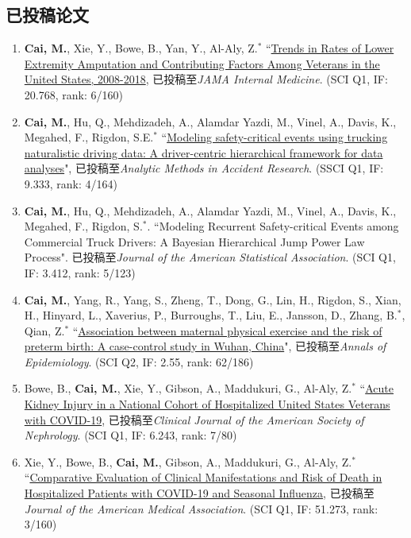 \documentclass[11pt, a4paper]{article}
\begin{document}
	\subsection*{已投稿论文}
	\begin{enumerate}[leftmargin=0ex,itemsep=1ex]
		\item \textbf{Cai, M.}, Xie, Y., Bowe, B., Yan, Y., Al-Aly, Z.$^\ast$ ``\ul{Trends in Rates of Lower Extremity Amputation and Contributing Factors Among Veterans in the United States, 2008-2018}, 已投稿至\emph{JAMA Internal Medicine}. (SCI Q1, IF: 20.768, rank: 6/160)
		
		\item \textbf{Cai, M.}, Hu, Q., Mehdizadeh, A., Alamdar Yazdi, M., Vinel, A., Davis, K., Megahed, F., Rigdon, S.E.$^\ast$ ``\ul{Modeling safety-critical events using trucking naturalistic driving data: A driver-centric hierarchical framework for data analyses}", 已投稿至\emph{Analytic Methods in Accident Research}. (SSCI Q1, IF: 9.333, rank: 4/164)
		
		\item \textbf{Cai, M.}, Hu, Q., Mehdizadeh, A., Alamdar Yazdi, M., Vinel, A., Davis, K., Megahed, F., Rigdon, S.$^\ast$. ``Modeling Recurrent Safety-critical Events among Commercial Truck Drivers: A Bayesian Hierarchical Jump Power Law Process". 已投稿至\emph{Journal of the American Statistical Association}. (SCI Q1, IF: 3.412, rank: 5/123)
		
		\item \textbf{Cai, M.}, Yang, R., Yang, S., Zheng, T., Dong, G., Lin, H., Rigdon, S., Xian, H., Hinyard, L., Xaverius, P., Burroughs, T., Liu, E., Jansson, D., Zhang, B.$^\ast$, Qian, Z.$^\ast$ ``\ul{Association between maternal physical exercise and the risk of preterm birth: A case-control study in Wuhan, China}", 已投稿至\emph{Annals of Epidemiology}. (SCI Q2, IF: 2.55, rank: 62/186)
		
		\item Bowe, B., \textbf{Cai, M.}, Xie, Y., Gibson, A., Maddukuri, G., Al-Aly, Z.$^\ast$ ``\ul{Acute Kidney Injury in a National Cohort of Hospitalized United States Veterans with COVID-19}, 已投稿至\emph{Clinical Journal of the American Society of Nephrology}. (SCI Q1, IF: 6.243, rank: 7/80)
		
		\item Xie, Y., Bowe, B., \textbf{Cai, M.}, Gibson, A., Maddukuri, G., Al-Aly, Z.$^\ast$ ``\ul{Comparative Evaluation of Clinical Manifestations and Risk of Death in Hospitalized Patients with COVID-19 and Seasonal Influenza}, 已投稿至\emph{Journal of the American Medical Association}. (SCI Q1, IF: 51.273, rank: 3/160)
		

\end{enumerate}
\end{document}
